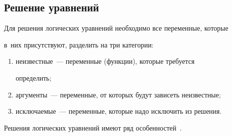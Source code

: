    


\subsection{Решение уравнений}


       


   Для решения логических уравнений необходимо все переменные, которые 


в~них присутствуют, разделить на три категории:


   \begin{enumerate}[(1)]


     \item неизвестные~--- переменные (функции), которые требуется 


определить;


     \item аргументы~--- переменные, от которых будут зависеть неизвестные;


     \item исключаемые~--- переменные, которые надо исключить из решения.


     \end{enumerate}


     


   Решения логических уравнений имеют ряд особенностей~\cite{8-pl}.



